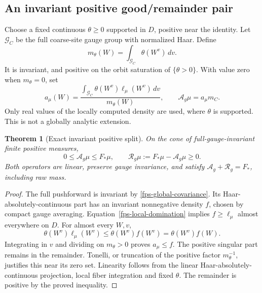 \documentclass[11pt]{article}
\newtheorem{theorem}{Theorem}[section]
\theoremstyle{remark}
\begin{document}
\subsection{An invariant positive good/remainder pair}
\label{fps-invariant-section}

Choose a fixed continuous \(\theta\ge0\) supported in \(D\), positive
near the identity. Let \(\mathcal G_C\) be the full coarse-site gauge
group with normalized Haar. Define
\[
 m_\theta(W)=\int_{\mathcal G_C}\theta(W^v)\,dv.
\]
It is invariant, and positive on the orbit saturation of
\(\{\theta>0\}\). With value zero when \(m_\theta=0\), set
\begin{equation}
 a_\mu(W)=\frac{\int_{\mathcal G_C}
                   \theta(W^v)\ell_\mu(W^v)\,dv}{m_\theta(W)},
 \qquad \mathcal A_g\mu=a_\mu m_C.
 \label{fps-orbit-extension}
\end{equation}
Only real values of the locally computed density are used, where
\(\theta\) is supported. This is not a globally analytic extension.

\begin{theorem}[Exact invariant positive split]
\label{fps-positive-split}
On the cone of full-gauge-invariant finite positive measures,
\begin{equation}
 0\le\mathcal A_g\mu\le F_*\mu,\qquad
 \mathcal R_g\mu:=F_*\mu-\mathcal A_g\mu\ge0.
 \label{fps-positive-operators}
\end{equation}
Both operators are linear, preserve gauge invariance, and satisfy
\(\mathcal A_g+\mathcal R_g=F_*\), including raw mass.
\end{theorem}
\begin{proof}
The full pushforward is invariant by
\eqref{fps-global-covariance}. Its Haar-absolutely-continuous part has
an invariant nonnegative density \(f\), chosen by compact gauge
averaging. Equation~\eqref{fps-local-domination} implies
\(f\ge\ell_\mu\) almost everywhere on \(D\). For almost every \(W,v\),
\[
 \theta(W^v)\ell_\mu(W^v)\le\theta(W^v)f(W^v)
                              =\theta(W^v)f(W).
\]
Integrating in \(v\) and dividing on \(m_\theta>0\) proves
\(a_\mu\le f\). The positive singular part remains in the remainder.
Tonelli, or truncation of the positive factor \(m_\theta^{-1}\),
justifies this near its zero set. Linearity follows from the linear
Haar-absolutely-continuous projection, local fiber integration and
fixed \(\theta\). The remainder is positive by the proved inequality.
\end{proof}
\end{document}
